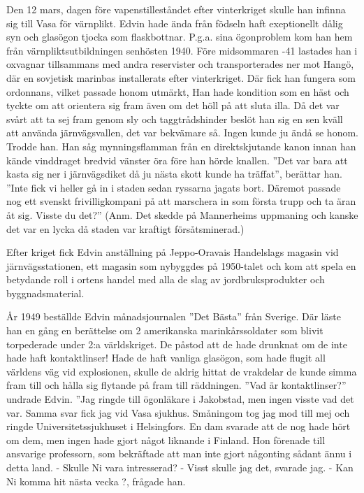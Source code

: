 Den 12 mars, dagen före vapenstilleståndet efter vinterkriget skulle han infinna sig till Vasa för värnplikt. Edvin hade ända från födseln haft exeptionellt dålig syn och glasögon tjocka som flaskbottnar. P.g.a. sina ögonproblem kom han hem från värnpliktsutbildningen senhösten 1940. Före midsommaren -41 lastades han i oxvagnar tillsammans med andra reservister och transporterades ner mot Hangö, där en sovjetisk marinbas installerats efter vinterkriget. Där fick han fungera som ordonnans, vilket passade honom utmärkt, Han hade kondition som en häst och tyckte om att orientera sig fram även om det höll på att sluta illa. Då det var svårt att ta sej fram genom sly och taggtrådshinder beslöt han sig en sen kväll att använda järnvägsvallen, det var bekvämare så. Ingen kunde ju ändå se honom. Trodde han. Han såg mynningsflamman från en direktskjutande kanon innan han kände vinddraget bredvid vänster öra före han hörde knallen. ”Det var bara att kasta sig ner i järnvägsdiket då ju nästa skott kunde ha träffat”, berättar han. ”Inte fick vi heller gå in i staden sedan ryssarna jagats bort. Däremot passade nog ett svenskt frivilligkompani på att marschera in som första trupp och ta äran åt sig. Visste du det?” (Anm. Det skedde på Mannerheims uppmaning och kanske det var en lycka då staden var kraftigt försåtsminerad.)

Efter kriget fick Edvin anställning på Jeppo-Oravais Handelslags magasin vid järnvägsstationen, ett magasin som nybyggdes på 1950-talet och kom att spela en betydande roll i ortens handel med alla de slag av jordbruksprodukter och byggnadsmaterial.

År 1949 beställde Edvin månadsjournalen ”Det Bästa” från Sverige. Där läste han en gång en berättelse om 2 amerikanska marinkårssoldater som blivit torpederade under 2:a världskriget. De påstod att de hade drunknat om de inte hade haft kontaktlinser! Hade de haft vanliga glasögon, som hade flugit all världens väg vid explosionen, skulle de aldrig hittat de vrakdelar de kunde simma fram till och hålla sig flytande på fram till räddningen. ”Vad är kontaktlinser?” undrade Edvin. ”Jag ringde till ögonläkare i Jakobstad, men ingen visste vad det var. Samma svar fick jag vid Vasa sjukhus. Småningom tog jag mod till mej och ringde Universitetssjukhuset i Helsingfors. En dam svarade att de nog hade hört om dem, men ingen hade gjort något liknande i Finland. Hon förenade till ansvarige professorn, som bekräftade att man inte gjort någonting sådant ännu i detta land.
  - Skulle Ni vara intresserad?
  - Visst skulle jag det, svarade jag.
  - Kan Ni komma hit nästa vecka ?, frågade han.

